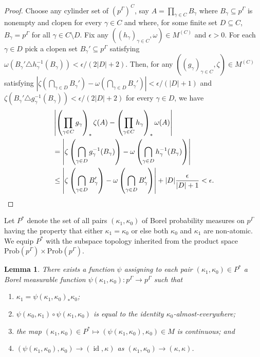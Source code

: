 \documentclass[12pt]{amsart}
\newtheorem{lem}[thm]{Lemma}
\theoremstyle{definition}
\DeclareMathOperator{\id}{id}
\newcommand{\symd}{\triangle}
\newcommand{\Prob}{\mathrm{Prob}}
\begin{document}
\begin{proof}
	Choose any cylinder set of $(p^\Gamma)^C$, say $A = \prod_{\gamma \in C} B_\gamma$ where $B_\gamma \subseteq p^\Gamma$ is nonempty and clopen for every $\gamma \in C$ and where, for some finite set $D \subseteq C$, $B_\gamma = p^\Gamma$ for all $\gamma \in C \setminus D$. Fix any $((h_\gamma)_{\gamma \in C}, \omega) \in M^{(C)}$ and $\epsilon > 0$. For each $\gamma \in D$ pick a clopen set $B_\gamma' \subseteq p^\Gamma$ satisfying $\omega(B_\gamma' \symd h_\gamma^{-1}(B_\gamma)) < \epsilon / (2|D|+2)$. Then, for any $((g_\gamma)_{\gamma \in C}, \zeta) \in M^{(C)}$ satisfying $|\zeta(\bigcap_{\gamma \in D} B_\gamma') - \omega(\bigcap_{\gamma \in D} B_\gamma')| < \epsilon/(|D|+1)$ and $\zeta(B_\gamma' \symd g_\gamma^{-1}(B_\gamma)) < \epsilon / (2|D|+2)$ for every $\gamma \in D$, we have
	\begin{align*}
		& \left| \left(\prod_{\gamma \in C} g_\gamma\right)_*\zeta(A) - \left(\prod_{\gamma \in C} h_\gamma\right)_*\omega(A) \right|\\
		& = \left| \zeta \left(\bigcap_{\gamma \in D} g_\gamma^{-1}(B_\gamma) \right) - \omega \left( \bigcap_{\gamma \in D} h_\gamma^{-1}(B_\gamma) \right)\right|\\
		& \leq \left| \zeta \left(\bigcap_{\gamma \in D} B_\gamma' \right) - \omega \left(\bigcap_{\gamma \in D} B_\gamma'\right)\right| + |D| \frac{\epsilon}{|D|+1} < \epsilon.\qedhere
	\end{align*}
\end{proof}

Let $P^*$ denote the set of all pairs $(\kappa_1, \kappa_0)$ of Borel probability measures on $p^\Gamma$ having the property that either $\kappa_1 = \kappa_0$ or else both $\kappa_0$ and $\kappa_1$ are non-atomic. We equip $P^*$ with the subspace topology inherited from the product space $\Prob(p^\Gamma) \times \Prob(p^\Gamma)$.

\begin{lem} \label{lem:pairmap}
	There exists a function $\psi$ assigning to each pair $(\kappa_1, \kappa_0) \in P^*$ a Borel measurable function $\psi(\kappa_1, \kappa_0) : p^\Gamma \rightarrow p^\Gamma$ such that
	\begin{enumerate}
		\item \label{item:pmap1} $\kappa_1 = \psi(\kappa_1, \kappa_0)_* \kappa_0$;
		\item \label{item:pmap2} $\psi(\kappa_0, \kappa_1) \circ \psi(\kappa_1, \kappa_0)$ is equal to the identity $\kappa_0$-almost-everywhere;
		\item \label{item:pmap3} the map $(\kappa_1, \kappa_0) \in P^* \mapsto (\psi(\kappa_1, \kappa_0), \kappa_0) \in M$ is continuous; and
		\item \label{item:pmap4} $(\psi(\kappa_1, \kappa_0), \kappa_0) \rightarrow (\id, \kappa)$ as $(\kappa_1, \kappa_0) \rightarrow (\kappa, \kappa)$.
	\end{enumerate}
\end{lem}
\end{document}
